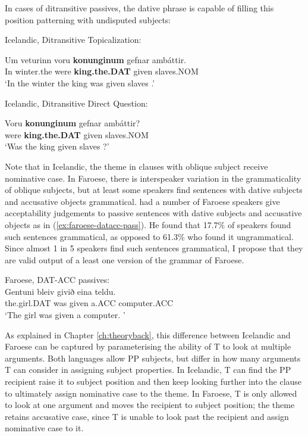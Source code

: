 In cases of ditransitive passives, the dative phrase is capable of filling this position patterning with undisputed subjects:

\begin{exe}
	\ex Icelandic, Ditransitive Topicalization:\label{ex:ice-dittop}
\begin{xlist}
	\ex \gll Um veturinn voru \textbf{konunginum} gefnar amb\'{a}ttir.\\
In winter.the were \textbf{king.the.DAT} given slaves.NOM\\
\trans `In the winter the king was given slaves \citep[ex. 47a]{Zaenen.1985}.'
\end{xlist}
\ex Icelandic, Ditransitive Direct Question:\label{ex:ice-ditdq}
\begin{xlist}
	\ex \gll Voru \textbf{konunginum} gefnar amb\'{a}ttir?\\
were \textbf{king.the.DAT} given slaves.NOM\\
\trans `Was the king given slaves \citep[ex. 48a]{Zaenen.1985}?'
\end{xlist}
\end{exe}

Note that in Icelandic, the theme in clauses with oblique subject receive nominative case. In Faroese, there is interspeaker variation in the grammaticality of oblique subjects, but at least some speakers find sentences with dative subjects and accusative objects grammatical. \cite{Eyorsson.2012} had a number of Faroese speakers give acceptability judgements to passive sentences with dative subjects and accusative objects as in (\ref{ex:faroese-datacc-pass}). He found that 17.7\% of speakers found such sentences grammatical, as opposed to 61.3\% who found it ungrammatical. Since almost 1 in 5 speakers find such sentences grammatical, I propose that they are valid output of a least one version of the grammar of Faroese.

\begin{exe}
	\ex Faroese, DAT-ACC passives:\label{ex:faroese-datacc-pass}\\
	\gll Gentuni bleiv givið eina teldu.\\
the.girl.DAT was given a.ACC computer.ACC\\
\trans `The girl was given a computer. \cite[ex 45b]{Eyorsson.2012}'
\end{exe}

As explained in Chapter \ref{ch:theoryback}, this difference between Icelandic and Faroese can be captured by parameterising the ability of T to look at multiple arguments. Both languages allow PP subjects, but differ in how many arguments T can consider in assigning subject properties. In Icelandic, T can find the PP recipient raise it to subject position and then keep looking further into the clause to ultimately assign nominative case to the theme. In Faroese, T is only allowed to look at one argument and moves the recipient to subject position; the theme retains accusative case, since T is unable to look past the recipient and assign nominative case to it.


